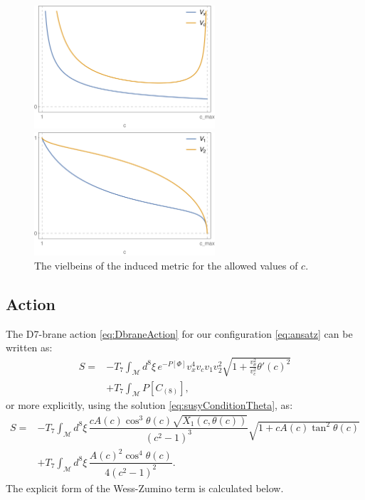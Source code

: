 \begin{figure}[t!]
\begin{center}
\includegraphics[width=0.6\textwidth]{pictures/vxvcb.png}
\end{center}
\vspace{0.05mm}
\begin{center}
\includegraphics[width=0.6\textwidth]{pictures/v1v2b.png}
\end{center}
\caption{\label{fig:vielbeins} The vielbeins of the induced metric for the allowed values of $c$.}
\end{figure}



\subsection{Action}


The D7-brane action \eqref{eq:DbraneAction} for our configuration \eqref{eq:ansatz} can be written as:
\begin{align} \label{eq:ActionWithTheta'}
 S  = & -T_7 \int_\mathcal{M} d^8\xi \, e^{-P[\Phi] } v_x^4 v_c v_1 v_2^2 \sqrt{1+\frac{v_\theta^2}{v_c^2}\theta'(c)^2}  \nonumber \\
      & + T_7\int _\mathcal{M} P[C_{(8)}],
\end{align}
or more explicitly, using the solution \eqref{eq:susyConditionTheta}, as:
\begin{align}\label{eq:ActionWithTheta}
 S = & -T_7 \int_\mathcal{M} d^8\xi \, \dfrac{c A(c) \cos^3\theta (c) \sqrt{X_1(c, \theta(c))}}{\left(c^2-1\right)^3} \sqrt{1+ c A(c) \tan^2\theta(c)} \nonumber \\
     & +T_7\int _\mathcal{M} d^8\xi \, \dfrac{A(c)^2 \cos^4\theta(c)}{4 \left(c^2-1\right)^2}.
\end{align}
The explicit form of the Wess-Zumino term is calculated below.

